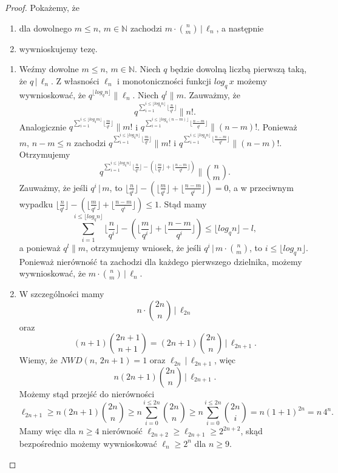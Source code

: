 \documentclass[declaration,shortabstract]{iithesis}
\theoremstyle{definition}
\theoremstyle{remark} \newtheorem{observation}{Obserwacja}
\theoremstyle{plain} \newtheorem{theorem}{Twierdzenie}
\theoremstyle{plain} \newtheorem{lemma}{Lemat}
\theoremstyle{remark} \newtheorem*{remark*}{Uwaga}
\theoremstyle{reminder} \newtheorem*{reminder*}{Przypomnienie}
\begin{document}
\begin{proof}
	Pokażemy, że 
	\begin{enumerate}[label=\arabic*.,leftmargin=.4in]
		\item dla dowolnego $m \leq n, \, m \in \mathbb{N}$ zachodzi $m \cdot {n \choose m} \, | \, \ell_n$, a następnie 
		\item wywnioskujemy tezę.
	\end{enumerate}
	\begin{enumerate}[label=Ad.\arabic*.,leftmargin=.4in]
		\item Weźmy dowolne $m \leq n, \, m \in \mathbb{N}$. Niech $q$ będzie dowolną liczbą pierwszą taką, że $q \, | \, \ell_n$. Z własności $\ell_n$ i monotoniczności funkcji $log_q\, x$ możemy wywnioskować, że $q^{\lfloor log_q n \rfloor} \parallel \ell_n$. Niech $q^l \parallel m$. Zauważmy, że \[q^{\sum_{i=1}^{i \leq \lfloor log_q n \rfloor} \lfloor \frac{n}{q^i}\rfloor} \parallel n!.\] Analogicznie $q^{\sum_{i=1}^{i \leq \lfloor log_q m \rfloor} \lfloor \frac{m}{q^i}\rfloor} \parallel m!$ i $q^{\sum_{i=1}^{i \leq \lfloor log_q (n-m) \rfloor} \lfloor \frac{n-m}{q^i}\rfloor} \parallel (n-m)!$. Ponieważ $m, \, n - m \leq n$ zachodzi $q^{\sum_{i=1}^{i \leq \lfloor log_q n \rfloor} \lfloor \frac{m}{q^i}\rfloor} \parallel m!$ i $q^{\sum_{i=1}^{i \leq \lfloor log_q n \rfloor} \lfloor \frac{n-m}{q^i}\rfloor} \parallel (n-m)!$. 
		      Otrzymujemy \[q^{\sum_{i=1}^{i \leq \lfloor log_q n \rfloor} \lfloor \frac{n}{q^i}\rfloor - (\lfloor \frac{m}{q^i}\rfloor + \lfloor \frac{n-m}{q^i}\rfloor)} \parallel {n \choose m}.\]    
		      Zauważmy, że jeśli $q^i \, | \, m$, to $\lfloor \frac{n}{q^i}\rfloor - (\lfloor \frac{m}{q^i}\rfloor + \lfloor \frac{n-m}{q^i}\rfloor) = 0$, a w przeciwnym wypadku $\lfloor \frac{n}{q^i}\rfloor - (\lfloor \frac{m}{q^i}\rfloor + \lfloor \frac{n-m}{q^i}\rfloor) \leq 1$. Stąd mamy \[\sum_{i=1}^{i \leq \lfloor log_qn \rfloor} \lfloor \frac{n}{q^i}\rfloor - (\lfloor \frac{m}{q^i}\rfloor + \lfloor \frac{n-m}{q^i}\rfloor) \leq \lfloor log_qn \rfloor - l,\] a ponieważ $q^l \parallel m$, otrzymujemy wniosek, że jeśli $q^i \, | \, m \cdot {n \choose m}$, to $i \leq \lfloor log_qn \rfloor$. Ponieważ nierówność ta zachodzi dla każdego pierwszego dzielnika, możemy wywnioskować, że $m \cdot {n \choose m} \, | \, \ell_n$.
		\item W szczególności mamy \[n \cdot {2n \choose n} \, | \, \ell_{2n}\] oraz \[(n+1){2n + 1 \choose n + 1} = (2n + 1){2n \choose n}\, |\, \ell_{2n+1}.\] Wiemy, że $NWD(n,\, 2n + 1) = 1$ oraz $\ell_{2n} \, | \, \ell_{2n + 1}$, więc \[n(2n + 1){2n \choose n}\, |\, \ell_{2n + 1}.\] Możemy stąd przejść do nierówności \[\ell_{2n + 1} \geq n(2n + 1){2n \choose n} \geq n \sum_{i=0}^{i \leq 2n}{2n \choose n} \geq n {\sum_{i=0}^{i \leq 2n}{2n \choose i}} = n(1 + 1)^{2n} = n \, 4^n.\]
		      Mamy więc dla $n \geq 4$ nierówność $\ell_{2n+2} \geq \ell_{2n+1} \geq 2^{2n + 2}$, skąd bezpośrednio możemy wywnioskować $\ell_n \geq 2^n$ dla $n \geq 9$.
	\end{enumerate}		
\end{proof}
\end{document}
